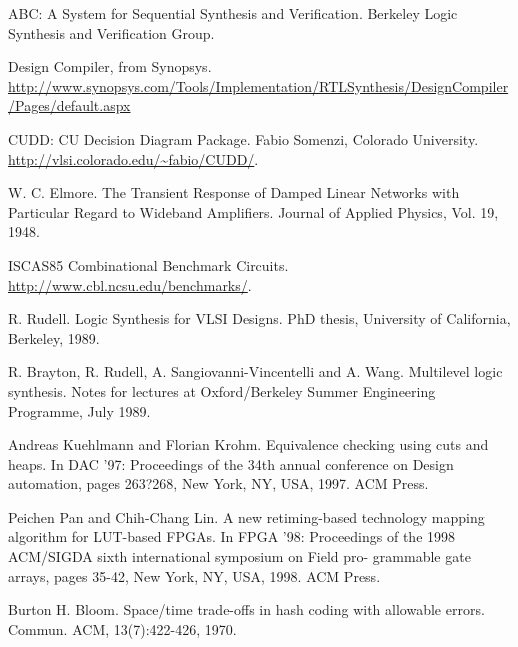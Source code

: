 \documentclass{tfg}
\begin{document}
%
%
%



\begin{thebibliography}{9}

ABC: A System for Sequential Synthesis and Verification. Berkeley Logic Synthesis and Verification Group.
 
Design Compiler, from Synopsys. \url{http://www.synopsys.com/Tools/Implementation/RTLSynthesis/DesignCompiler/Pages/default.aspx}

CUDD: CU Decision Diagram Package. Fabio Somenzi, Colorado University. \url{http://vlsi.colorado.edu/~fabio/CUDD/}.

W. C. Elmore. The Transient Response of Damped Linear Networks with Particular Regard to Wideband Amplifiers. Journal of Applied Physics, Vol. 19, 1948.

ISCAS85 Combinational Benchmark Circuits. \url{http://www.cbl.ncsu.edu/benchmarks/}.

R. Rudell. Logic Synthesis for VLSI Designs. PhD thesis, University of California, Berkeley, 1989.

R. Brayton, R. Rudell, A. Sangiovanni-Vincentelli and A. Wang. Multilevel logic synthesis. Notes for lectures at Oxford/Berkeley Summer Engineering Programme, July 1989.

Andreas Kuehlmann and Florian Krohm. Equivalence checking using
cuts and heaps. In DAC '97: Proceedings of the 34th annual conference
 on Design automation, pages 263?268, New York, NY, USA, 1997. ACM
  Press.

Peichen Pan and Chih-Chang Lin. A new retiming-based technology
mapping algorithm for LUT-based FPGAs. In FPGA '98: Proceedings
 of the 1998 ACM/SIGDA sixth international symposium on Field pro-
grammable gate arrays, pages 35-42, New York, NY, USA, 1998. ACM
 Press.
 
Burton H. Bloom. Space/time trade-offs in hash coding with allowable
errors. Commun. ACM, 13(7):422-426, 1970.


\end{thebibliography}
\end{document}
